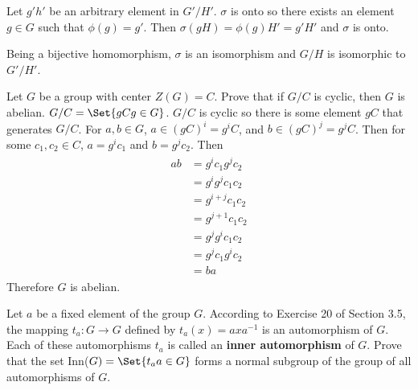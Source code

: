 \documentclass[paper=a4, fontsize=11pt]{jhwhw} %
\providecommand\given{} %
\begin{document}
\begin{enumerate}
        Let $g'h'$ be an arbitrary element in $G'/H'$. $\sigma$ is onto so there exists an element $g\in G$ such that $\phi(g) = g'$. Then $\sigma(gH) = \phi(g)H' = g'H'$ and $\sigma$ is onto.

        Being a bijective homomorphism, $\sigma$ is an isomorphism and $G/H$ is isomorphic to $G'/H'$.



\end{enumerate}


Let $G$ be a group with center $Z(G) = C$. Prove that if $G/C$ is cyclic, then $G$ is abelian.
\solution
$G/C = \Set{gC\given g\in G}$. $G/C$ is cyclic so there is some element $gC$ that generates $G/C$. For $a, b\in G$, $a\in (gC)^{i} = g^iC$, and $b\in (gC)^j = g^jC$. Then for some $c_1, c_2 \in C$, $a=g^ic_1$ and $b=g^jc_2$. Then
\begin{align}
    \begin{split}
        ab &= g^ic_1g^jc_2\\
           &= g^ig^jc_1c_2\\
           &= g^{i+j}c_1c_2\\
           &= g^{j+1}c_1c_2\\
           &= g^jg^ic_1c_2\\
           &= g^jc_1g^ic_2\\
           &= ba
    \end{split}
\end{align}
Therefore $G$ is abelian.

Let $a$ be a fixed element of the group $G$. According to Exercise 20 of Section 3.5, the mapping $t_a:G\to G$ defined by $t_a(x) = axa^{-1}$ is an automorphism of $G$. Each of these automorphisms $t_a$ is called an \textbf{inner automorphism} of $G$. Prove that the set Inn($G) = \Set{t_a\given a\in G}$ forms a normal subgroup of the group of all automorphisms of $G$.
\solution
\end{document}
